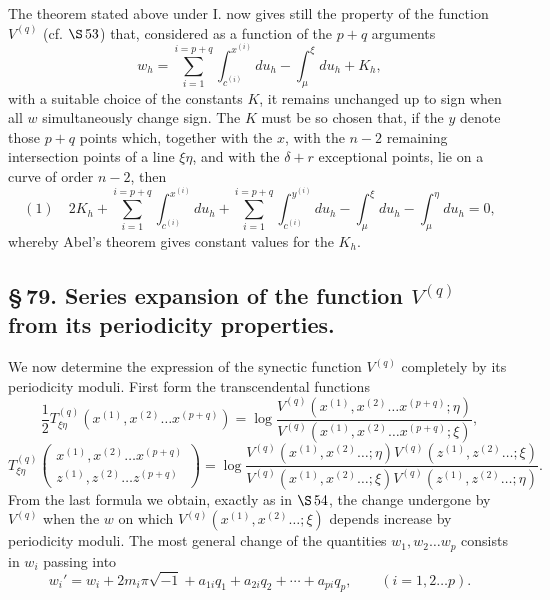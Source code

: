 \documentclass[10pt]{article}
\begin{document}
The theorem stated above under I. now gives still the property of the function \(V^{(q)}\) (cf. \(\S\,53\)) that, considered as a function of the \(p+q\) arguments
\[
w_h=\sum_{i=1}^{i=p+q}\int_{c^{(i)}}^{x^{(i)}}du_h-\int_{\mu}^{\xi}du_h+K_h,
\]
with a suitable choice of the constants \(K\), it remains unchanged up to sign when all \(w\) simultaneously change sign. The \(K\) must be so chosen that, if the \(y\) denote those \(p+q\) points which, together with the \(x\), with the \(n-2\) remaining intersection points of a line \(\xi\eta\), and with the \(\delta+r\) exceptional points, lie on a curve of order \(n-2\), then
\[
(1)\quad
2K_h+
\sum_{i=1}^{i=p+q}\int_{c^{(i)}}^{x^{(i)}}du_h+
\sum_{i=1}^{i=p+q}\int_{c^{(i)}}^{y^{(i)}}du_h
-\int_{\mu}^{\xi}du_h-\int_{\mu}^{\eta}du_h=0,
\]
whereby Abel's theorem gives constant values for the \(K_h\).

\subsection*{\S\,79. Series expansion of the function \(V^{(q)}\) from its periodicity properties.}

We now determine the expression of the synectic function \(V^{(q)}\) completely by its periodicity moduli. First form the transcendental functions
\[
\frac12T_{\xi\eta}^{(q)}(x^{(1)},x^{(2)}\ldots x^{(p+q)})
=
\log
\frac{V^{(q)}(x^{(1)},x^{(2)}\ldots x^{(p+q)};\eta)}
     {V^{(q)}(x^{(1)},x^{(2)}\ldots x^{(p+q)};\xi)},
\]
\[
T_{\xi\eta}^{(q)}
\begin{pmatrix}
x^{(1)},x^{(2)}\ldots x^{(p+q)}\\
z^{(1)},z^{(2)}\ldots z^{(p+q)}
\end{pmatrix}
=
\log
\frac{
V^{(q)}(x^{(1)},x^{(2)}\ldots;\eta)
V^{(q)}(z^{(1)},z^{(2)}\ldots;\xi)
}{
V^{(q)}(x^{(1)},x^{(2)}\ldots;\xi)
V^{(q)}(z^{(1)},z^{(2)}\ldots;\eta)
}.
\]
From the last formula we obtain, exactly as in \(\S\,54\), the change undergone by \(V^{(q)}\) when the \(w\) on which \(V^{(q)}(x^{(1)},x^{(2)}\ldots;\xi)\) depends increase by periodicity moduli. The most general change of the quantities \(w_1,w_2\ldots w_p\) consists in \(w_i\) passing into
\[
w_i'=w_i+2m_i\pi\sqrt{-1}+a_{1i}q_1+a_{2i}q_2+\cdots+a_{pi}q_p,
\qquad (i=1,2\ldots p).
\]

\end{document}
